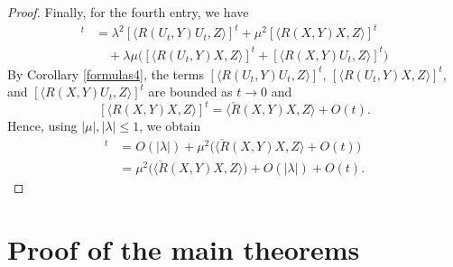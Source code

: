 \begin{proof}
	Finally, for the fourth entry, we have
	\begin{align*}
		[\langle R(\Psi,Y)\Psi,Z\rangle ]^t&{}= \lambda^2[\langle R(U_t,Y)U_t,Z\rangle]^t+\mu^2 [\langle R(X,Y)X,Z\rangle]^t\\
		&\quad{}+ \lambda\mu\bigl([\langle R(U_t,Y)X,Z\rangle]^t + [\langle R(X,Y)U_t,Z\rangle]^t \bigr)
	\end{align*}		
	By Corollary \ref{formulas4}, the terms $[\langle R(U_t,Y)U_t,Z\rangle]^t$, $[\langle R(U_t,Y)X,Z\rangle]^t$, and $[\langle R(X,Y)U_t,Z\rangle]^t$ are bounded as $t\to 0$ and
	\[ [\langle R(X,Y)X,Z\rangle]^t=\bigl\langle\check{R}(X,Y)X,Z\bigr\rangle+O(t). \]
	Hence, using $|\mu|,|\lambda|\leq 1$, we obtain
	\begin{align*}
		[\langle R(\Psi,Y)\Psi,Z\rangle ]^t&{}= O(|\lambda|)+\mu^2\bigl(\bigl\langle \check{R}(X,Y)X,Z\bigr\rangle+O(t) \bigr)\\
		&{}= \mu^2\bigl(\bigl\langle \check{R}(X,Y)X,Z\bigr\rangle\bigr)+O(|\lambda|)+O(t).
 \tag*{\qed}
 \end{align*}
 \renewcommand{\qed}{}
\end{proof}



\section{Proof of the main theorems}\label{proofs}




